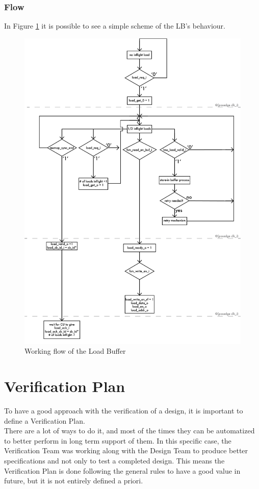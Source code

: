 \subsubsection{Flow}
In Figure \ref{lb-flow} it is possible to see a simple scheme of the LB's behaviour.
\newpage
\begin{figure}[H]
    \centering
    \includegraphics[scale = 0.8]{Chapter_2/img/lb-flow.png}
    \caption{Working flow of the Load Buffer}
    \label{lb-flow}
\end{figure}

\section{Verification Plan}
To have a good approach with the verification of a design, it is important to define a Verification Plan.\\
There are a lot of ways to do it, and most of the times they can be automatized to better perform in long term support of them. In this specific case, the Verification Team was working along with the Design Team to produce better specifications and not only to test a completed design. This means the Verification Plan is done following the general rules to have a good value in future, but it is not entirely defined a priori.\\

